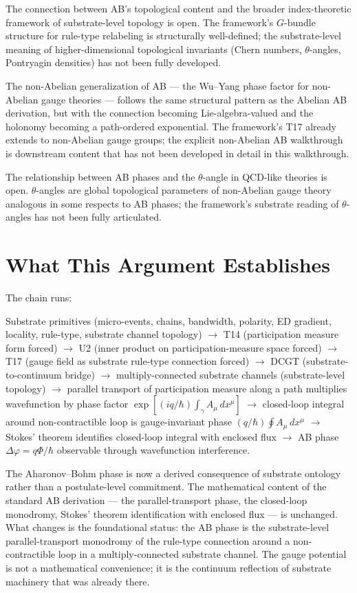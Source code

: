 \documentclass[11pt,a4paper]{article}
\begin{document}
The connection between AB's topological content and the broader index-theoretic framework of substrate-level topology is open. The framework's $G$-bundle structure for rule-type relabeling is structurally well-defined; the substrate-level meaning of higher-dimensional topological invariants (Chern numbers, $\theta$-angles, Pontryagin densities) has not been fully developed.

The non-Abelian generalization of AB --- the Wu--Yang phase factor for non-Abelian gauge theories --- follows the same structural pattern as the Abelian AB derivation, but with the connection becoming Lie-algebra-valued and the holonomy becoming a path-ordered exponential. The framework's T17 already extends to non-Abelian gauge groups; the explicit non-Abelian AB walkthrough is downstream content that has not been developed in detail in this walkthrough.

The relationship between AB phases and the $\theta$-angle in QCD-like theories is open. $\theta$-angles are global topological parameters of non-Abelian gauge theory analogous in some respects to AB phases; the framework's substrate reading of $\theta$-angles has not been fully articulated.

\section{What This Argument Establishes}

The chain runs:

Substrate primitives (micro-events, chains, bandwidth, polarity, ED gradient, locality, rule-type, substrate channel topology) $\to$ T14 (participation measure form forced) $\to$ U2 (inner product on participation-measure space forced) $\to$ T17 (gauge field as substrate rule-type connection forced) $\to$ DCGT (substrate-to-continuum bridge) $\to$ multiply-connected substrate channels (substrate-level topology) $\to$ parallel transport of participation measure along a path multiplies wavefunction by phase factor $\exp[(iq/\hbar)\int_\gamma A_\mu \, dx^\mu]$ $\to$ closed-loop integral around non-contractible loop is gauge-invariant phase $(q/\hbar)\oint A_\mu \, dx^\mu$ $\to$ Stokes' theorem identifies closed-loop integral with enclosed flux $\to$ AB phase $\Delta\varphi = q\Phi/\hbar$ observable through wavefunction interference.

The Aharonov--Bohm phase is now a derived consequence of substrate ontology rather than a postulate-level commitment. The mathematical content of the standard AB derivation --- the parallel-transport phase, the closed-loop monodromy, Stokes' theorem identification with enclosed flux --- is unchanged. What changes is the foundational status: the AB phase is the substrate-level parallel-transport monodromy of the rule-type connection around a non-contractible loop in a multiply-connected substrate channel. The gauge potential is not a mathematical convenience; it is the continuum reflection of substrate machinery that was already there.
\end{document}
